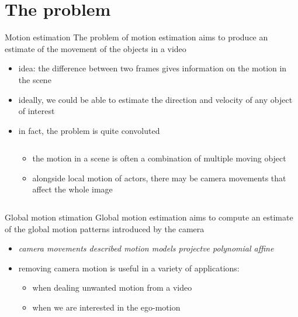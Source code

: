 \documentclass[aspectratio=1610,xcolor=dvipsnames]{beamer}
\begin{document}
\section{The problem}
\begin{frame}{Motion estimation}
    The problem of motion estimation aims to produce an estimate of the movement of the objects in a video
    \bigskip
    \begin{itemize}
        \item idea: the difference between two frames gives information on the motion in the scene
        \item ideally, we could be able to estimate the direction and velocity of any object of interest
        \item in fact, the problem is quite convoluted
        \begin{columns}
            \begin{column}{0.4\textwidth}
                \begin{itemize}
                    \item the motion in a scene is often a combination of multiple moving object
                    \item alongside local motion of actors, there may be camera movements that affect the whole image
                \end{itemize}
            \end{column}
            \begin{column}{0.4\textwidth}
                \begin{center}
                \end{center}
            \end{column}
        \end{columns} 
    \end{itemize}
\end{frame}

\begin{frame}{Global motion stimation}
    Global motion estimation aims to compute an estimate of the global motion patterns introduced by the camera
    \bigskip
    \begin{itemize}
        \item \textit{camera movements described motion models projectve polynomial affine}
        \item removing camera motion is useful in a variety of applications:
        \begin{itemize}
            \item when dealing unwanted motion from a video 
            \item when we are interested in the ego-motion
        \end{itemize}
    \end{itemize}    
\end{frame}
\end{document}
